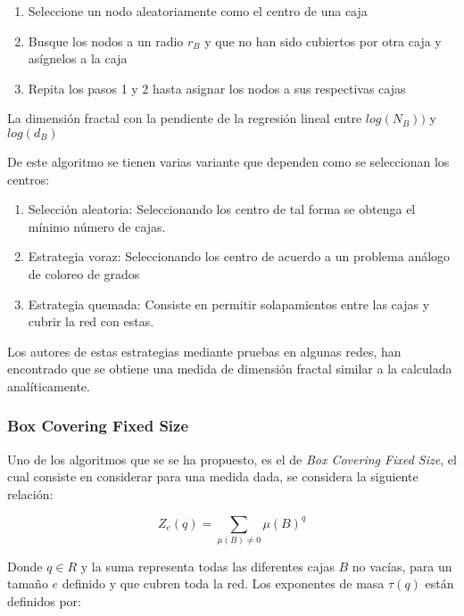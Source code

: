 \begin{enumerate}
    \item Seleccione un nodo aleatoriamente como el centro de una caja
    \item Busque los nodos a un radio $r_B$ y que no han sido cubiertos por otra caja y asígnelos a la caja
    \item Repita los pasos 1 y 2 hasta asignar los nodos a sus respectivas cajas
\end{enumerate}

La dimensión fractal con la pendiente de la regresión lineal entre $log(N_B))$ y $log(d_B)$

De este algoritmo se tienen varias variante que dependen como se seleccionan los centros:

\begin{enumerate}
    \item Selección aleatoria\cite{Kim2007B}: Seleccionando los centro de tal forma se obtenga el mínimo número de cajas.
    \item Estrategia voraz\cite{Song2007}: Seleccionando los centro de acuerdo a un problema análogo de coloreo de grados
    \item Estrategia quemada\cite{Song2007}: Consiste en permitir solapamientos entre las cajas  y cubrir la red con estas.
\end{enumerate}

Los autores de estas estrategias mediante pruebas en algunas redes, han encontrado que se obtiene una medida de dimensión fractal similar a la calculada analíticamente.



\subsubsection{Box Covering Fixed Size}

Uno de los algoritmos que se se ha propuesto, es el de \textit{Box Covering Fixed Size}\cite{Halsey1986}\cite{RendondelaTorre2017}\cite{Yu2003}, el cual consiste en considerar para una medida dada, se considera la siguiente relación:

\begin{equation}
    Z_e(q) =  \sum \limits_{\mu(B) \neq 0} \mu(B)^q
\end{equation}

Donde $q\in R$ y la suma representa todas las diferentes cajas $B$ no vacías, para un tamaño $e$ definido y que cubren toda la red. Los exponentes de masa $\tau(q)$ están definidos por:


